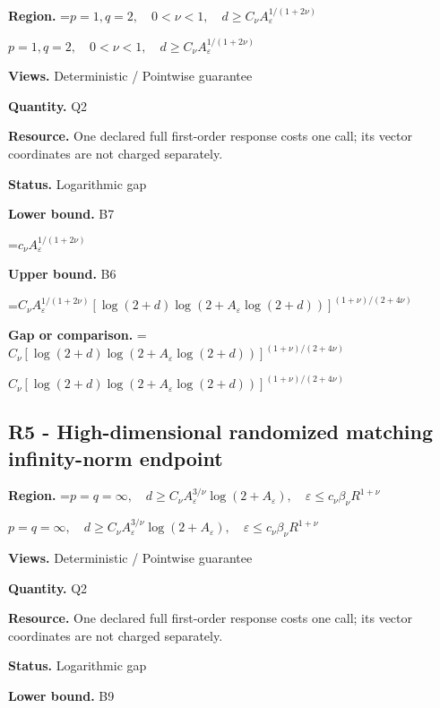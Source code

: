 \documentclass[10pt,a4paper]{article}
\newcommand{\AtlasMath}[1]{\par\begingroup\centering\setbox0=\hbox{$\displaystyle #1$}\ifdim\wd0>1.4\linewidth\typeout{ATLAS WIDE FORMULA: \the\wd0}\fi\ifdim\wd0>\linewidth\resizebox{\linewidth}{!}{\box0}\else\box0\fi\par\endgroup}
\newcommand{\AtlasInlineMath}[1]{\begingroup\setbox0=\hbox{$#1$}\ifdim\wd0>.4\linewidth\endgroup\AtlasMath{#1}\else\endgroup$#1$\fi}
\begin{document}
\textbf{Region.} \AtlasInlineMath{p=1,q=2,\quad0<\nu<1,\quad d\ge C_\nu A_\varepsilon^{1/(1+2\nu)}}



\textbf{Views.} Deterministic / Pointwise guarantee



\textbf{Quantity.} Q2



\textbf{Resource.} One declared full first-order response costs one call; its vector coordinates are not charged separately.



\textbf{Status.} Logarithmic gap



\textbf{Lower bound.} B7



\AtlasMath{c_\nu A_\varepsilon^{1/(1+2\nu)}}


\textbf{Upper bound.} B6



\AtlasMath{C_\nu A_\varepsilon^{1/(1+2\nu)}[\log(2+d)\log(2+A_\varepsilon\log(2+d))]^{(1+\nu)/(2+4\nu)}}


\textbf{Gap or comparison.} \AtlasInlineMath{C_\nu[\log(2+d)\log(2+A_\varepsilon\log(2+d))]^{(1+\nu)/(2+4\nu)}}



\subsection{R5 - High-dimensional randomized matching infinity-norm endpoint}


\textbf{Region.} \AtlasInlineMath{p=q=\infty,\quad d\ge C_\nu A_\varepsilon^{3/\nu}\log(2+A_\varepsilon),\quad\varepsilon\le c_\nu\beta_\nu R^{1+\nu}}



\textbf{Views.} Deterministic / Pointwise guarantee



\textbf{Quantity.} Q2



\textbf{Resource.} One declared full first-order response costs one call; its vector coordinates are not charged separately.



\textbf{Status.} Logarithmic gap



\textbf{Lower bound.} B9
\end{document}
